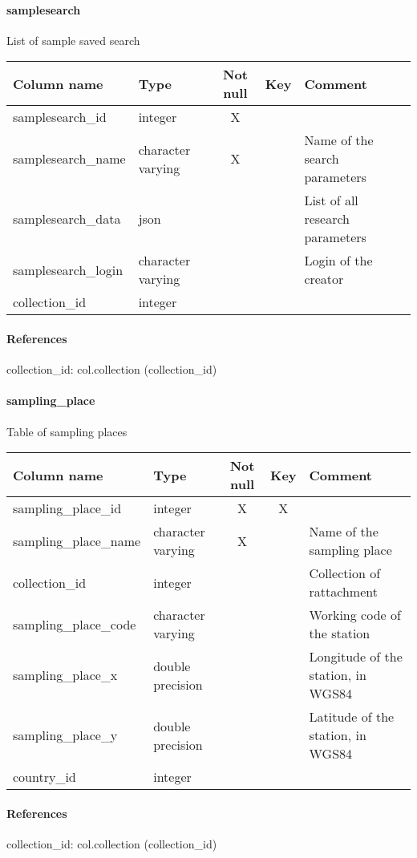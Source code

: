 \paragraph{samplesearch}
List of sample saved search

\begin{tabular}{|l| p{2cm}|c|c| p{5cm}|}
\hline
Column name & Type & Not null & Key & Comment \\
\hline
samplesearch\_id & integer & X &  & \\
samplesearch\_name & character varying & X &  & Name of the search parameters\\
samplesearch\_data & json &  &  & List of all research parameters\\
samplesearch\_login & character varying &  &  & Login of the creator\\
collection\_id & integer &  &  & \\
\hline
\end{tabular}
\paragraph{References}
collection\_id: col.collection (collection\_id)

\paragraph{sampling\_place}
Table of sampling places

\begin{tabular}{|l| p{2cm}|c|c| p{5cm}|}
\hline
Column name & Type & Not null & Key & Comment \\
\hline
sampling\_place\_id & integer & X & X & \\
sampling\_place\_name & character varying & X &  & Name of the sampling place\\
collection\_id & integer &  &  & Collection of rattachment\\
sampling\_place\_code & character varying &  &  & Working code of the station\\
sampling\_place\_x & double precision &  &  & Longitude of the station, in WGS84\\
sampling\_place\_y & double precision &  &  & Latitude of the station, in WGS84\\
country\_id & integer &  &  & \\
\hline
\end{tabular}
\paragraph{References}
collection\_id: col.collection (collection\_id)

